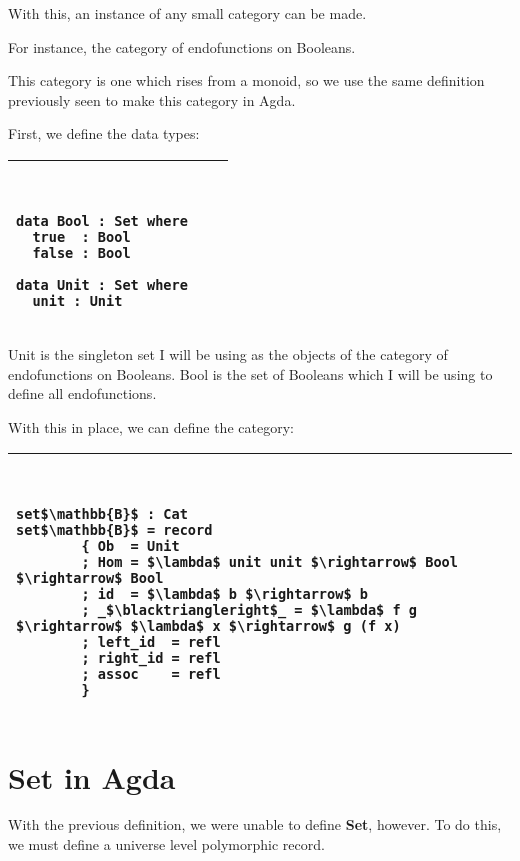 \documentclass[../main.tex]{subfiles}
\begin{document}
With this, an instance of any small category can be made.

For instance, the category of endofunctions on Booleans.

This category is one which rises from a monoid, so we use the same definition previously seen to make this category in Agda.

First, we define the data types:

\begin{tabular}{lll}
\toprule
{\tt
\begin{lstlisting}[mathescape]
data Bool : Set where
  true  : Bool
  false : Bool

data Unit : Set where
  unit : Unit
\end{lstlisting}
}
\\
\bottomrule
\end{tabular}

Unit is the singleton set I will be using as the objects of the category of endofunctions on Booleans. Bool is the set of Booleans which I will be using to define all endofunctions.

With this in place, we can define the category:

\begin{tabular}{lll}
\toprule
{\tt
\begin{lstlisting}[mathescape]
set$\mathbb{B}$ : Cat
set$\mathbb{B}$ = record
        { Ob  = Unit
        ; Hom = $\lambda$ unit unit $\rightarrow$ Bool $\rightarrow$ Bool
        ; id  = $\lambda$ b $\rightarrow$ b
        ; _$\blacktriangleright$_ = $\lambda$ f g  $\rightarrow$ $\lambda$ x $\rightarrow$ g (f x)
        ; left_id  = refl
        ; right_id = refl
        ; assoc    = refl
        }
\end{lstlisting}
}
\\
\bottomrule
\end{tabular}

\section{\textbf{Set} in Agda}

With the previous definition, we were unable to define \textbf{Set}, however. To do this, we must define a universe level polymorphic record.
\end{document}
